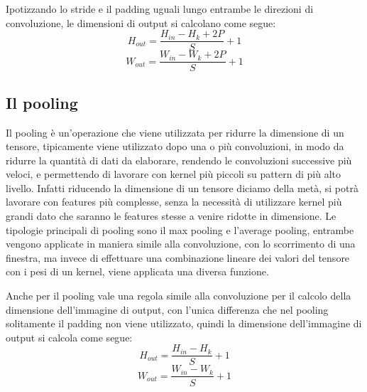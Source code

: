 Ipotizzando lo stride e il padding uguali lungo entrambe le direzioni di convoluzione, le dimensioni di output si calcolano come segue:
\begin{equation}
    H_{out} = \frac{H_{in} - H_{k} + 2P}{S} + 1
\end{equation}
\begin{equation}
    W_{out} = \frac{W_{in} - W_{k} + 2P}{S} + 1
\end{equation}

\subsection{Il pooling}
Il pooling è un'operazione che viene utilizzata per ridurre la dimensione di un tensore, tipicamente viene utilizzato dopo una o più convoluzioni,
in modo da ridurre la quantità di dati da elaborare, rendendo le convoluzioni successive più veloci, e permettendo di lavorare con kernel più piccoli
su pattern di più alto livello. Infatti riducendo la dimensione di un tensore diciamo della metà, si potrà lavorare con features più complesse,
senza la necessità di utilizzare kernel più grandi dato che saranno le features stesse a venire ridotte in dimensione.
Le tipologie principali di pooling sono il max pooling e l'average pooling, entrambe vengono applicate in maniera simile alla convoluzione,
con lo scorrimento di una finestra, ma invece di effettuare una combinazione lineare dei valori del tensore con i pesi di un kernel, 
viene applicata una diversa funzione.

Anche per il pooling vale una regola simile alla convoluzione per il calcolo della dimensione dell'immagine di output, con l'unica differenza che nel
pooling solitamente il padding non viene utilizzato, quindi la dimensione dell'immagine di output si calcola come segue:
\begin{equation}
    H_{out} = \frac{H_{in} - H_{k}}{S} + 1
\end{equation}
\begin{equation}
    W_{out} = \frac{W_{in} - W_{k}}{S} + 1
\end{equation}

